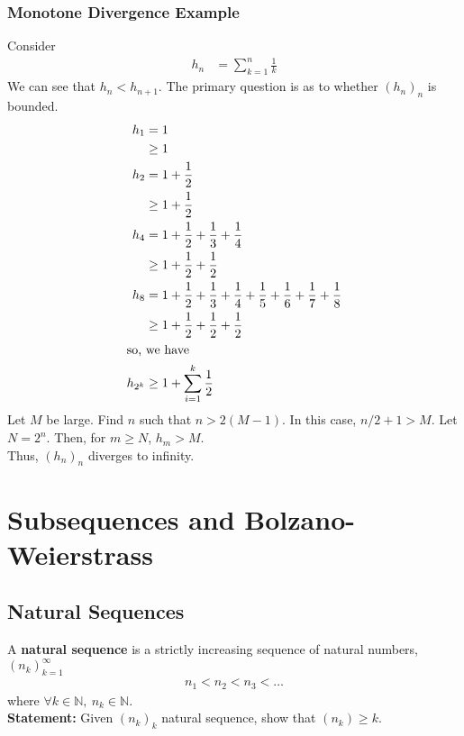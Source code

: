 \documentclass[10pt]{extarticle}
\newcommand{\N}{\mathbb{N}}
\begin{document}
    \subsubsection{Monotone Divergence Example}%
    Consider
    \begin{align*}
      h_n &= \sum_{k=1}^{n} \frac{1}{k}
    \end{align*}
    We can see that $h_{n} < h_{n+1}$. The primary question is as to whether $(h_n)_n$ is bounded.
    \begin{align*}
      h_{1} &= 1 \\&\geq 1\\
      h_{2} &= 1 + \frac{1}{2}\\ &\geq 1 + \frac{1}{2}\\
      h_{4} &= 1 + \frac{1}{2} + \frac{1}{3} + \frac{1}{4}\\ &\geq 1 + \frac{1}{2} + \frac{1}{2}\\
      h_{8} &= 1 + \frac{1}{2} + \frac{1}{3} + \frac{1}{4} + \frac{1}{5} + \frac{1}{6} + \frac{1}{7} + \frac{1}{8}\\
            &\geq 1 + \frac{1}{2}  + \frac{1}{2} + \frac{1}{2}\\
            \shortintertext{so, we have}
      h_{2^k} &\geq 1 + \sum_{i=1}^{k}\frac{1}{2}\\
    \end{align*}
    Let $M$ be large. Find $n$ such that $n > 2(M-1)$. In this case, $n/2 + 1 > M$. Let $N = 2^n$. Then, for $m \geq N$, $h_{m} > M$.\\

    Thus, $(h_n)_n$ diverges to infinity.
  \section{Subsequences and Bolzano-Weierstrass}%
  \subsection{Natural Sequences}%
    A \textbf{natural sequence} is a strictly increasing sequence of natural numbers, $(n_{k})_{k=1}^{\infty}$
    \begin{align*}
      n_{1} < n_2 < n_3<\dots
    \end{align*}
    where $\forall k\in\N,~n_k\in\N$.\\
    
    \textbf{Statement:} Given $(n_k)_k$ natural sequence, show that $(n_k) \geq k$.\\
\end{document}
